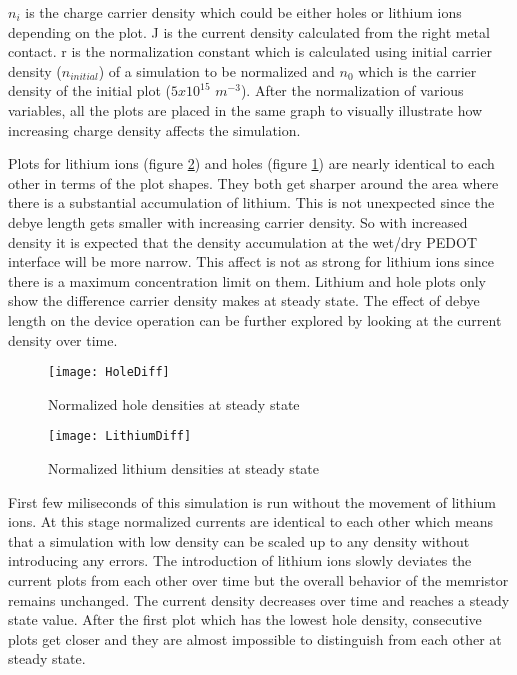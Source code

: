 \begin{doublespace}
$n_{i}$ is the charge carrier density which could be either holes or lithium ions depending on the plot. J is the current density calculated from the right metal contact. r is the normalization constant which is calculated using initial carrier density ($n_{initial}$) of a simulation to be normalized and $n_{0}$ which is the carrier density of the initial plot ($5 x 10^{15}$ $m^{-3}$). After the normalization of various variables, all the plots are placed in the same graph to visually illustrate how increasing charge density affects the simulation. 

Plots for lithium ions (figure \ref{LithiumDiff}) and holes (figure \ref{HoleDiff}) are nearly identical to each other in terms of the plot shapes. They both get sharper around the area where there is a substantial accumulation of lithium. This is not unexpected since the debye length gets smaller with increasing carrier density. So with increased density it is expected that the density accumulation at the wet/dry PEDOT interface will be more narrow. This affect is not as strong for lithium ions since there is a maximum concentration limit on them. Lithium and hole plots only show the difference carrier density makes at steady state. The effect of debye length on the device operation can be further explored by looking at the current density over time.   

\begin{figure}[!htp]
\centering
\texttt{[image: HoleDiff]}
\caption{Normalized hole densities at steady state} 
\label{HoleDiff}
\end{figure}

\begin{figure}[!htp]
\centering
\texttt{[image: LithiumDiff]}
\caption{Normalized lithium densities at steady state} 
\label{LithiumDiff}
\end{figure}

First few miliseconds of this simulation is run without the movement of lithium ions. At this stage normalized currents are identical to each other which means that a simulation with low density can be scaled up to any density without introducing any errors. The introduction of lithium ions slowly deviates the current plots from each other over time but the overall behavior of the memristor remains unchanged. The current density decreases over time and reaches a steady state value. After the first plot which has the lowest hole density, consecutive plots get closer and they are almost impossible to distinguish from each other at steady state.


\end{doublespace}
